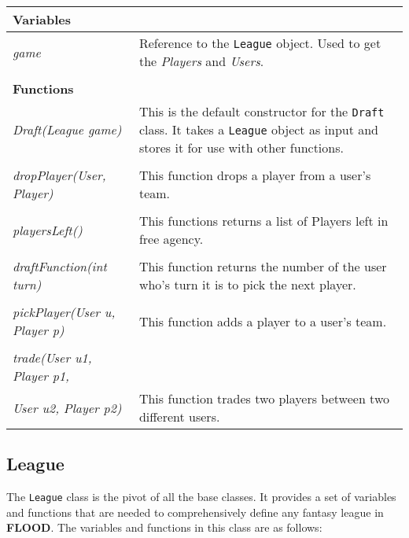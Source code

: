 \documentclass[12pt]{report}
\begin{document}
\begin{flushleft}
\begin{singlespace}
\begin{tabular}[pos]{ l | p{10.5cm} }
\hline
\textbf{Variables} & \\
\hline
\textit{game} & Reference to the \texttt{League} object. Used to get the \textit{Players} and \textit{Users}. \\
\\
\hline
\textbf{Functions} & \\
\hline
\textit{Draft(League game)} & This is the default constructor for the \texttt{Draft} class. It takes a \texttt{League} object as input and stores it for use with other functions. \\
\\
\textit{dropPlayer(User, Player)} & This function drops a player from a user's team. \\
\\
\textit{playersLeft()} & This functions returns a list of Players left in free agency. \\
\\
\textit{draftFunction(int turn)} & This function returns the number of the user who's turn it is to pick the next player. \\
\\
\textit{pickPlayer(User u, Player p)} & This function adds a player to a user's team. \\
\\
\textit{trade(User u1, Player p1,} \\ \textit{User u2, Player p2)} & This function trades two players between two different users.
\\
\hline
\end{tabular}
\end{singlespace}
\end{flushleft}

\subsection{League}

The \texttt{League} class is the pivot of all the base classes. It provides a set of variables and functions that are needed to comprehensively define any fantasy league in \textbf{FLOOD}. The variables and functions in this class are as follows:
\end{document}
